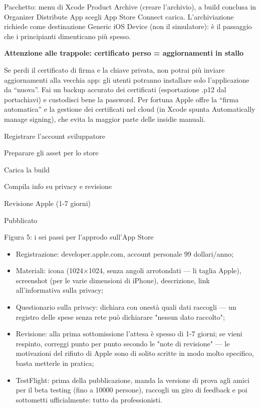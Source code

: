 Pacchetto: menu di Xcode Product Archive (creare l'archivio), a build conclusa in Organizer Distribute App scegli App Store Connect carica. L'archiviazione richiede come destinazione Generic iOS Device (non il simulatore): è il passaggio che i principianti dimenticano più spesso.

\textbf{Attenzione alle trappole: certificato perso = aggiornamenti in stallo}\par

Se perdi il certificato di firma e la chiave privata, non potrai più inviare aggiornamenti alla vecchia app: gli utenti potranno installare solo l'applicazione da “nuova”. Fai un backup accurato dei certificati (esportazione .p12 dal portachiavi) e custodisci bene la password. Per fortuna Apple offre la “firma automatica” e la gestione dei certificati nel cloud (in Xcode spunta Automatically manage signing), che evita la maggior parte delle insidie manuali.


Registrare l'account sviluppatore

Preparare gli asset per lo store

Carica la build

Compila info su privacy e revisione

Revisione Apple (1-7 giorni)

Pubblicato

\begin{center}\small\color{gray}Figura 5: i sei passi per l'approdo sull'App Store\end{center}

\begin{itemize}
  \item Registrazione: developer.apple.com, account personale 99 dollari/anno;
  \item Materiali: icona (1024×1024, senza angoli arrotondati — li taglia Apple), screenshot (per le varie dimensioni di iPhone), descrizione, link all'informativa sulla privacy;
  \item Questionario sulla privacy: dichiara con onestà quali dati raccogli — un registro delle spese senza rete può dichiarare "nessun dato raccolto";
  \item Revisione: alla prima sottomissione l'attesa è spesso di 1-7 giorni; se vieni respinto, correggi punto per punto secondo le "note di revisione" — le motivazioni del rifiuto di Apple sono di solito scritte in modo molto specifico, basta metterle in pratica;
  \item TestFlight: prima della pubblicazione, manda la versione di prova agli amici per il beta testing (fino a 10000 persone), raccogli un giro di feedback e poi sottometti ufficialmente: tutto da professionisti.
\end{itemize}

